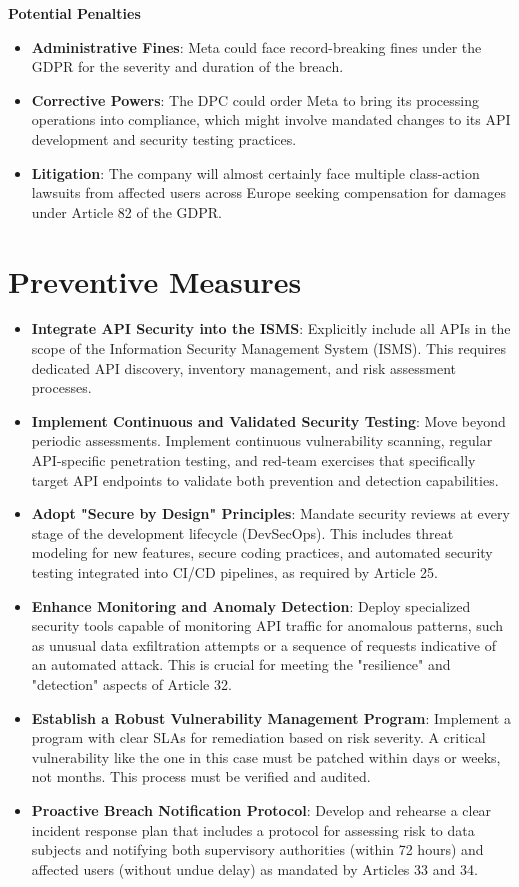 \documentclass{article}
\begin{document}
\textbf{Potential Penalties}\begin{itemize}
\item \textbf{Administrative Fines}: Meta could face record-breaking fines under the GDPR for the severity and duration of the breach.

\item \textbf{Corrective Powers}: The DPC could order Meta to bring its processing operations into compliance, which might involve mandated changes to its API development and security testing practices.

\item \textbf{Litigation}: The company will almost certainly face multiple class-action lawsuits from affected users across Europe seeking compensation for damages under Article 82 of the GDPR.
\end{itemize}
\section{Preventive Measures}
\begin{itemize}
    \item \textbf{Integrate API Security into the ISMS}: Explicitly include all APIs in the scope of the Information Security Management System (ISMS). This requires dedicated API discovery, inventory management, and risk assessment processes.

\item \textbf{Implement Continuous and Validated Security Testing}: Move beyond periodic assessments. Implement continuous vulnerability scanning, regular API-specific penetration testing, and red-team exercises that specifically target API endpoints to validate both prevention and detection capabilities.

\item \textbf{Adopt "Secure by Design" Principles}: Mandate security reviews at every stage of the development lifecycle (DevSecOps). This includes threat modeling for new features, secure coding practices, and automated security testing integrated into CI/CD pipelines, as required by Article 25.

\item \textbf{Enhance Monitoring and Anomaly Detection}: Deploy specialized security tools capable of monitoring API traffic for anomalous patterns, such as unusual data exfiltration attempts or a sequence of requests indicative of an automated attack. This is crucial for meeting the "resilience" and "detection" aspects of Article 32.

\item \textbf{Establish a Robust Vulnerability Management Program}: Implement a program with clear SLAs for remediation based on risk severity. A critical vulnerability like the one in this case must be patched within days or weeks, not months. This process must be verified and audited.

\item \textbf{Proactive Breach Notification Protocol}: Develop and rehearse a clear incident response plan that includes a protocol for assessing risk to data subjects and notifying both supervisory authorities (within 72 hours) and affected users (without undue delay) as mandated by Articles 33 and 34.
\end{itemize}
\end{document}
